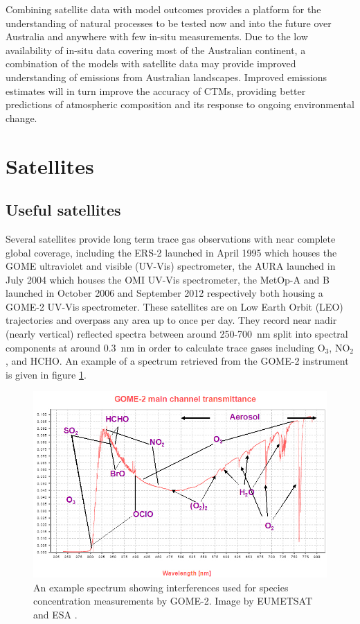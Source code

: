     Combining satellite data with model outcomes provides a platform for the understanding of natural processes to be tested now and into the future over Australia and anywhere with few in-situ measurements.
    Due to the low availability of in-situ data covering most of the Australian continent, a combination of the models with satellite data may provide improved understanding of emissions from Australian landscapes.
    Improved emissions estimates will in turn improve the accuracy of CTMs, providing better predictions of atmospheric composition and its response to ongoing environmental change.
  
\section{Satellites}
\label{ch_LitRev:sec:satellites}


  \subsection{Useful satellites}
    Several satellites provide long term trace gas observations with near complete global coverage, including the ERS-2 launched in April 1995 which houses the GOME ultraviolet and visible (UV-Vis) spectrometer, the AURA launched in July 2004 which houses the OMI UV-Vis spectrometer, the MetOp-A and B launched in October 2006 and September 2012 respectively both housing a GOME-2 UV-Vis spectrometer.
    These satellites are on Low Earth Orbit (LEO) trajectories and overpass any area up to once per day. 
    They record near nadir (nearly vertical) reflected spectra between around 250-700~nm split into spectral components at around $0.3$~nm in order to calculate trace gases including O$_3$, NO$_2$, and HCHO.
    An example of a spectrum retrieved from the GOME-2 instrument is given in figure \ref{ch_LitRev:fig:gomeproducts}.

    \begin{figure}
      \includegraphics[width=\textwidth]{Figures/GOME_SPECTRUM.jpg}
      \caption{An example spectrum showing interferences used for species concentration measurements by GOME-2. Image by EUMETSAT and ESA \citep{GOME2Image}.}
      \label{ch_LitRev:fig:gomeproducts}
    \end{figure}

